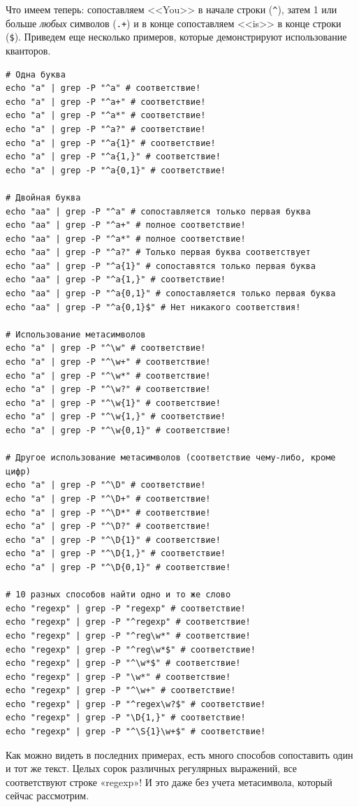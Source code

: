 \documentclass[a4paper,12pt,final,openany]{extbook}
\begin{document}
Что имеем теперь: сопоставляем <<You>> в начале строки (\texttt{\^{}}),
затем 1 или больше \emph{любых} символов (\texttt{.+}) и в конце
сопоставляем <<is>> в конце строки (\texttt{\$}). Приведем еще несколько
примеров, которые демонстрируют использование кванторов.
\begin{verbatim}
# Одна буква
echo "a" | grep -P "^a" # соответствие!
echo "a" | grep -P "^a+" # соответствие!
echo "a" | grep -P "^a*" # соответствие!
echo "a" | grep -P "^a?" # соответствие!
echo "a" | grep -P "^a{1}" # соответствие!
echo "a" | grep -P "^a{1,}" # соответствие!
echo "a" | grep -P "^a{0,1}" # соответствие!

# Двойная буква
echo "aa" | grep -P "^a" # сопоставляется только первая буква
echo "aa" | grep -P "^a+" # полное соответствие!
echo "aa" | grep -P "^a*" # полное соответствие!
echo "aa" | grep -P "^a?" # Только первая буква соответствует
echo "aa" | grep -P "^a{1}" # сопоставятся только первая буква
echo "aa" | grep -P "^a{1,}" # соответствие!
echo "aa" | grep -P "^a{0,1}" # сопоставляется только первая буква
echo "aa" | grep -P "^a{0,1}$" # Нет никакого соответствия!

# Использование метасимволов
echo "a" | grep -P "^\w" # соответствие!
echo "a" | grep -P "^\w+" # соответствие!
echo "a" | grep -P "^\w*" # соответствие!
echo "a" | grep -P "^\w?" # соответствие!
echo "a" | grep -P "^\w{1}" # соответствие!
echo "a" | grep -P "^\w{1,}" # соответствие!
echo "a" | grep -P "^\w{0,1}" # соответствие!

# Другое использование метасимволов (соответствие чему-либо, кроме цифр)
echo "a" | grep -P "^\D" # соответствие!
echo "a" | grep -P "^\D+" # соответствие!
echo "a" | grep -P "^\D*" # соответствие!
echo "a" | grep -P "^\D?" # соответствие!
echo "a" | grep -P "^\D{1}" # соответствие!
echo "a" | grep -P "^\D{1,}" # соответствие!
echo "a" | grep -P "^\D{0,1}" # соответствие!

# 10 разных способов найти одно и то же слово
echo "regexp" | grep -P "regexp" # соответствие!
echo "regexp" | grep -P "^regexp" # соответствие!
echo "regexp" | grep -P "^reg\w*" # соответствие!
echo "regexp" | grep -P "^reg\w*$" # соответствие!
echo "regexp" | grep -P "^\w*$" # соответствие!
echo "regexp" | grep -P "\w*" # соответствие!
echo "regexp" | grep -P "^\w+" # соответствие!
echo "regexp" | grep -P "^regex\w?$" # соответствие!
echo "regexp" | grep -P "\D{1,}" # соответствие!
echo "regexp" | grep -P "^\S{1}\w+$" # соответствие!
\end{verbatim}
Как можно видеть в последних примерах, есть много способов
сопоставить один и тот же текст. Целых сорок различных регулярных
выражений, все соответствуют строке «regexp»! И это даже без учета
метасимвола, который сейчас рассмотрим.
\end{document}
